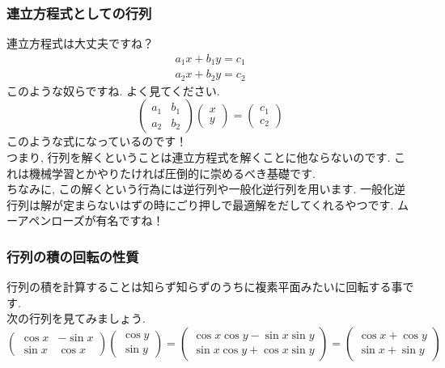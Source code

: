 \documentclass[11pt,a4paper]{jsarticle}
\begin{document}
\subsubsection{連立方程式としての行列}
連立方程式は大丈夫ですね？
\begin{eqnarray}
a_1x + b_1y = c_1
\end{eqnarray}
\begin{eqnarray}
a_2x + b_2y = c_2
\end{eqnarray}
このような奴らですね. よく見てください.
\[
  \left(	
  \begin{array}{cc}
  a_1 & b_1 \\
  a_2 & b_2
  \end{array}
  \right)
  \left(
  \begin{array}{c}
  x \\
  y
  \end{array}
  \right)
  =
  \left(
  \begin{array}{l}
  c_1\\
  c_2
  \end{array}
  \right)
\]
このような式になっているのです！\\
つまり, 行列を解くということは連立方程式を解くことに他ならないのです. これは機械学習とかやりたければ圧倒的に崇めるべき基礎です.\\
ちなみに, この解くという行為には逆行列や一般化逆行列を用います. 一般化逆行列は解が定まらないはずの時にごり押しで最適解をだしてくれるやつです. ムーアペンローズが有名ですね！\\

\subsubsection{行列の積の回転の性質}
行列の積を計算することは知らず知らずのうちに複素平面みたいに回転する事です. \\
次の行列を見てみましょう.\\
\[
  \left(	
  \begin{array}{cc}
  \cos x & -\sin x \\
  \sin x & \cos x
  \end{array}
  \right)
  \left(
  \begin{array}{c}
  \cos y \\
  \sin y
  \end{array}
  \right)
  =
  \left(
  \begin{array}{l}
  \cos x\cos y - \sin x\sin y\\
  \sin x\cos y + \cos x\sin y
  \end{array}
  \right)
  =
  \left(
  \begin{array}{c}
  \cos x + \cos y\\
  \sin x + \sin y
  \end{array}
  \right)
\]
\end{document}
